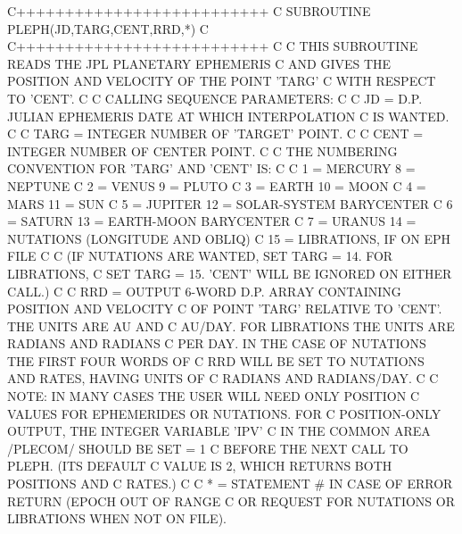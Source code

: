 \documentclass[twoside,11pt,nolof]{starlink}
\providecommand{\hdg}[1]{\vskip4pt plus2pt\leavevmode\kern-1em \underline{\large{#1}}\par}
\begin{document}
\begin{terminalv}
C++++++++++++++++++++++++++
C
      SUBROUTINE PLEPH(JD,TARG,CENT,RRD,*)
C
C++++++++++++++++++++++++++
C
C     THIS SUBROUTINE READS THE JPL PLANETARY EPHEMERIS
C     AND GIVES THE POSITION AND VELOCITY OF THE POINT 'TARG'
C     WITH RESPECT TO 'CENT'.
C
C     CALLING SEQUENCE PARAMETERS:
C
C       JD = D.P. JULIAN EPHEMERIS DATE AT WHICH INTERPOLATION
C            IS WANTED.
C
C     TARG = INTEGER NUMBER OF 'TARGET' POINT.
C
C     CENT = INTEGER NUMBER OF CENTER POINT.
C
C            THE NUMBERING CONVENTION FOR 'TARG' AND 'CENT' IS:
C
C                1 = MERCURY           8 = NEPTUNE
C                2 = VENUS             9 = PLUTO
C                3 = EARTH            10 = MOON
C                4 = MARS             11 = SUN
C                5 = JUPITER          12 = SOLAR-SYSTEM BARYCENTER
C                6 = SATURN           13 = EARTH-MOON BARYCENTER
C                7 = URANUS           14 = NUTATIONS (LONGITUDE AND OBLIQ)
C                            15 = LIBRATIONS, IF ON EPH FILE
C
C             (IF NUTATIONS ARE WANTED, SET TARG = 14. FOR LIBRATIONS,
C              SET TARG = 15. 'CENT' WILL BE IGNORED ON EITHER CALL.)
C
C      RRD = OUTPUT 6-WORD D.P. ARRAY CONTAINING POSITION AND VELOCITY
C            OF POINT 'TARG' RELATIVE TO 'CENT'. THE UNITS ARE AU AND
C            AU/DAY. FOR LIBRATIONS THE UNITS ARE RADIANS AND RADIANS
C            PER DAY. IN THE CASE OF NUTATIONS THE FIRST FOUR WORDS OF
C            RRD WILL BE SET TO NUTATIONS AND RATES, HAVING UNITS OF
C            RADIANS AND RADIANS/DAY.
C
C            NOTE: IN MANY CASES THE USER WILL NEED ONLY POSITION
C                  VALUES FOR EPHEMERIDES OR NUTATIONS. FOR
C                  POSITION-ONLY OUTPUT, THE INTEGER VARIABLE 'IPV'
C                  IN THE COMMON AREA /PLECOM/ SHOULD BE SET = 1
C                  BEFORE THE NEXT CALL TO PLEPH. (ITS DEFAULT
C                  VALUE IS 2, WHICH RETURNS BOTH POSITIONS AND
C                  RATES.)
C
C        * = STATEMENT \# IN CASE OF ERROR RETURN (EPOCH OUT OF RANGE
C            OR REQUEST FOR NUTATIONS OR LIBRATIONS WHEN NOT ON FILE).
\end{terminalv}


\newpage                                               %


\end{document}
